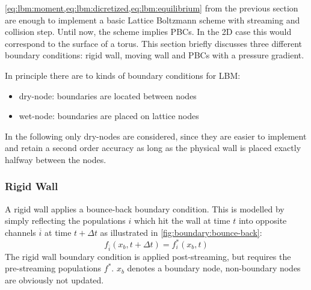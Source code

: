 \cref{eq:lbm:moment,eq:lbm:dicretized,eq:lbm:equilibrium} from the previous section are enough to implement a basic Lattice Boltzmann scheme with streaming and collision step. Until now, the scheme implies \glspl{PBC}. In the 2D case this would correspond to the surface of a torus. This section briefly discusses three different boundary conditions: rigid wall, moving wall and \glspl{PBC} with a pressure gradient.

In principle there are to kinds of boundary conditions for \gls{LBM}:
\begin{itemize}
    \item dry-node: boundaries are located between nodes
    \item wet-node: boundaries are placed on lattice nodes
\end{itemize}
In the following only dry-nodes are considered, since they are easier to implement and retain a second order accuracy as long as the physical wall is placed exactly halfway between the nodes.

\subsubsection{Rigid Wall}

A rigid wall applies a bounce-back boundary condition. This is modelled by simply reflecting the populations $i$ which hit the wall at time $t$ into opposite channels $\overline{i}$ at time $t + \Delta t$ as illustrated in \cref{fig:boundary:bounce-back}:
\begin{equation}
    f_{\overline{i}}(x_b,t+\Delta t) = f_i^*(x_b,t)
    \label{eq:boundary:rigid}
\end{equation}
The rigid wall boundary condition is applied post-streaming, but requires the pre-streaming populations $f^*$. $x_b$ denotes a boundary node, non-boundary nodes are obviously not updated.

